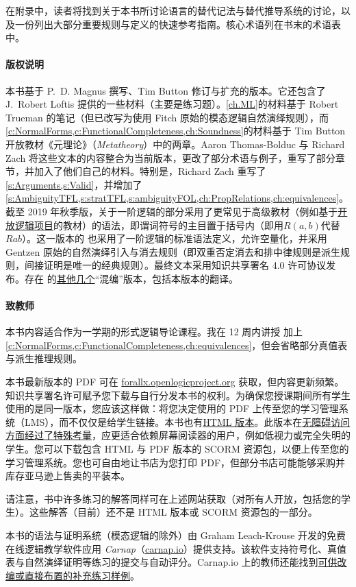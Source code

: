 在附录中，读者将找到关于本书所讨论语言的替代记法与替代推导系统的讨论，以及一份列出大部分重要规则与定义的快速参考指南。核心术语列在书末的术语表中。

\paragraph{版权说明} 本书基于 P.~D. Magnus 撰写、Tim Button 修订与扩充的版本。它还包含了 J.~Robert Loftis 提供的一些材料（主要是练习题）。\cref{ch.ML}的材料基于 Robert Trueman 的笔记（但已改写为使用 Fitch 原始的模态逻辑自然演绎规则），而\cref{c:NormalForms,c:FunctionalCompleteness,ch:Soundness}的材料基于 Tim Button 开放教材《元理论》（\textit{Metatheory}）中的两章。Aaron Thomas-Bolduc 与 Richard Zach 将这些文本的内容整合为当前版本，更改了部分术语与例子，重写了部分章节，并加入了他们自己的材料。特别是，Richard Zach 重写了\cref{s:Arguments,s:Valid}，并增加了\cref{s:AmbiguityTFL,s:stratTFL,s:ambiguityFOL,ch:PropRelations,ch:equivalences}。截至 2019 年秋季版，关于一阶逻辑的部分采用了更常见于高级教材（例如基于\href{https://openlogicproject.org/}{开放逻辑项目}的教材）的语法，即谓词符号的主目置于括号内（即用$R(a,b)$代替$Rab$）。这一版本的 \forallx{} 也采用了一阶逻辑的标准语法定义，允许空量化，并采用 Gentzen 原始的自然演绎引入与消去规则（即双重否定消去和排中律规则是派生规则，间接证明是唯一的经典规则）。最终文本采用知识共享署名 4.0 许可协议发布。存在 \forallx 的\href{https://github.com/OpenLogicProject/OpenLogic/wiki/Other-Logic-Textbooks}{其他几个}“混编”版本，包括本版本的翻译。

\paragraph{致教师} 本书内容适合作为一学期的形式逻辑导论课程。我在 12 周内讲授 加上\cref{c:NormalForms,c:FunctionalCompleteness,ch:equivalences}，但会省略部分真值表与派生推理规则。

本书最新版本的 PDF 可在 \href{https://forallx.openlogicproject.org}{forallx.openlogicproject.org} 获取，但内容更新频繁。知识共享署名许可赋予您下载与自行分发本书的权利。为确保您授课期间所有学生使用的是同一版本，您应该这样做：将您决定使用的 PDF 上传至您的学习管理系统（LMS），而不仅仅是给学生链接。本书也有\href{https://forallx.openlogicproject.org/html/}{HTML 版本}。此版本在\href{https://forallx.openlogicproject.org/html/A4.html}{无障碍访问方面经过了特殊考量}，应更适合依赖屏幕阅读器的用户，例如低视力或完全失明的学生。您可以下载包含 HTML 与 PDF 版本的 SCORM 资源包，以便上传至您的学习管理系统。您也可自由地让书店为您打印 PDF，但部分书店可能能够采购并库存亚马逊上售卖的平装本。

请注意，书中许多练习的解答同样可在上述网站获取（对所有人开放，包括您的学生）。这些解答（目前）还不是 HTML 版本或 SCORM 资源包的一部分。

本书的语法与证明系统（模态逻辑的除外）由 Graham Leach-Krouse 开发的免费在线逻辑教学软件应用 \textit{Carnap}（\href{https://carnap.io}{carnap.io}）提供支持。该软件支持符号化、真值表与自然演绎证明等练习的提交与自动评分。Carnap.io 上的教师还能找到\href{https://carnap.io/shared/rzach@ucalgary.ca/forall%20x:%20Calgary.md}{可供改编或直接布置的补充练习样例}。

